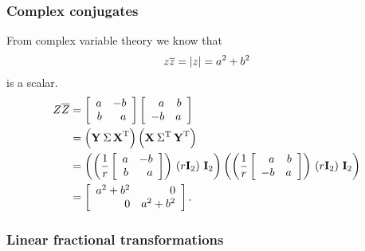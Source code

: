 \subsubsection{Complex conjugates}
From complex variable theory we know that
\begin{equation}
  z\overline{z} = \abs{z} = a^{2}+b^{2}
\end{equation}
is a scalar.
\begin{equation}
  \begin{split}
    Z \overline{Z} &= \mat{rr}{a&-b\\b&a}\mat{rr}{a&b\\-b&a}\\
      &= \paren{\svd{T}}\paren{\X{}\,\sig{T}\,\Y{T}}\\
      &= \paren{\paren{\frac{1}{r}\mat{rr}{a&-b\\b&a}}\,\paren{r\I{2}}\,\I{2}} \paren{\paren{\frac{1}{r}\mat{rr}{a&b\\-b&a}}\,\paren{r\I{2}}\,\I{2}} \\
      &= \mat{rr}{a^{2}+b^{2}&0\\0&a^{2}+b^{2}}.
  \end{split}
\end{equation}

\subsubsection{Linear fractional transformations}


\endinput